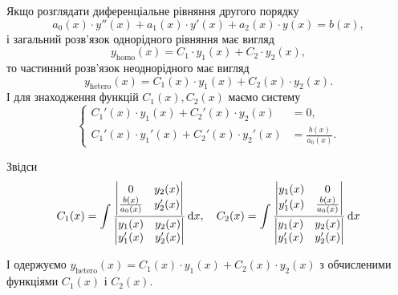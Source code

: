 Якщо розглядати диференціальне рівняння другого порядку
\begin{equation}
	\label{eq:3.3.27}
	a_0(x) \cdot y''(x) + a_1(x) \cdot y'(x) + a_2(x) \cdot y(x) = b(x),
\end{equation}
і загальний розв’язок однорідного рівняння має вигляд
\begin{equation}
	\label{eq:3.3.28}
	y_{\text{homo}}(x) = C_1 \cdot y_1(x) + C_2 \cdot y_2(x),
\end{equation}
то частинний розв’язок неоднорідного має вигляд 
\begin{equation}
	\label{eq:3.3.29}
	y_{\text{hetero}}(x) = C_1(x) \cdot y_1(x) + C_2(x) \cdot y_2(x).
\end{equation}
І для знаходження функцій $C_1(x), C_2(x)$ маємо систему
\begin{equation}
	\label{eq:3.3.30}
	\left\{ \begin{aligned}
		C_1'(x) \cdot y_1(x) + C_2'(x) \cdot y_2(x) &= 0, \\
		C_1'(x) \cdot y_1'(x) + C_2'(x) \cdot y_2'(x) &= \frac{b(x)}{a_0(x)}.
	\end{aligned} \right.
\end{equation}

Звідси
\begin{equation}
	\label{eq:3.3.31}
	C_1(x) = \int \frac{\begin{vmatrix} 0 & y_2(x) \\ \frac{b(x)}{a_0(x)} & y_2'(x) \end{vmatrix}}{\begin{vmatrix} y_1(x) & y_2(x) \\ y_1'(x) & y_2'(x) \end{vmatrix}} \mathop{}\!\mathrm{d} x, \quad C_2(x) = \int \frac{\begin{vmatrix} y_1(x) & 0 \\ y_1'(x) & \frac{b(x)}{a_0(x)} \end{vmatrix}}{\begin{vmatrix} y_1(x) & y_2(x) \\ y_1'(x) & y_2'(x) \end{vmatrix}} \mathop{}\!\mathrm{d} x
\end{equation}

І одержуємо $y_{\text{hetero}}(x) = C_1(x) \cdot y_1(x) + C_2(x) \cdot y_2(x)$ з обчисленими функціями $C_1(x)$ і $C_2(x)$.
